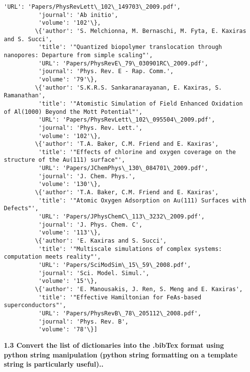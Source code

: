 \documentclass[11pt]{article}
\begin{document}
\begin{Verbatim}[commandchars=\\\{\}]
          'URL': 'Papers/PhysRevLett\_102\_149703\_2009.pdf',
          'journal': 'Ab initio',
          'volume': '102'\},
         \{'author': 'S. Melchionna, M. Bernaschi, M. Fyta, E. Kaxiras and S. Succi',
          'title': '"Quantized biopolymer translocation through nanopores: Departure from simple scaling"',
          'URL': 'Papers/PhysRevE\_79\_030901RC\_2009.pdf',
          'journal': 'Phys. Rev. E - Rap. Comm.',
          'volume': '79'\},
         \{'author': 'S.K.R.S. Sankaranarayanan, E. Kaxiras, S. Ramanathan',
          'title': '"Atomistic Simulation of Field Enhanced Oxidation of Al(1000) Beyond the Mott Potential"',
          'URL': 'Papers/PhysRevLett\_102\_095504\_2009.pdf',
          'journal': 'Phys. Rev. Lett.',
          'volume': '102'\},
         \{'author': 'T.A. Baker, C.M. Friend and E. Kaxiras',
          'title': '"Effects of chlorine and oxygen coverage on the structure of the Au(111) surface"',
          'URL': 'Papers/JChemPhys\_130\_084701\_2009.pdf',
          'journal': 'J. Chem. Phys.',
          'volume': '130'\},
         \{'author': 'T.A. Baker, C.M. Friend and E. Kaxiras',
          'title': '"Atomic Oxygen Adsorption on Au(111) Surfaces with Defects"',
          'URL': 'Papers/JPhysChemC\_113\_3232\_2009.pdf',
          'journal': 'J. Phys. Chem. C',
          'volume': '113'\},
         \{'author': 'E. Kaxiras and S. Succi',
          'title': '"Multiscale simulations of complex systems: computation meets reality"',
          'URL': 'Papers/SciModSim\_15\_59\_2008.pdf',
          'journal': 'Sci. Model. Simul.',
          'volume': '15'\},
         \{'author': 'E. Manousakis, J. Ren, S. Meng and E. Kaxiras',
          'title': '"Effective Hamiltonian for FeAs-based superconductors"',
          'URL': 'Papers/PhysRevB\_78\_205112\_2008.pdf',
          'journal': 'Phys. Rev. B',
          'volume': '78'\}]
\end{Verbatim}
            
    \textbf{1.3 Convert the list of dictionaries into the .bibTex format
using python string manipulation (python string formatting on a template
string is particularly useful)..}
\end{document}
